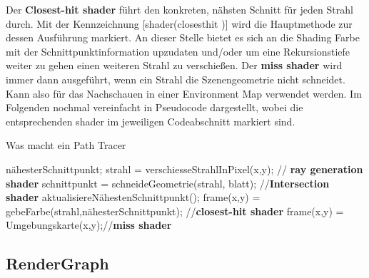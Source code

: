 Der \textbf{Closest-hit shader} führt den konkreten, nähsten Schnitt für jeden Strahl
durch. Mit der Kennzeichnung [shader(\dq closesthit \dq)] wird die Hauptmethode zur 
dessen Ausführung markiert. An dieser Stelle bietet es sich an die Shading Farbe 
mit der Schnittpunktinformation upzudaten und/oder um eine Rekursionstiefe weiter 
zu gehen einen weiteren Strahl zu verschießen. 
Der \textbf{miss shader} wird immer dann ausgeführt, wenn ein Strahl die
Szenengeometrie nicht schneidet. Kann also für das Nachschauen in einer 
Environment Map verwendet werden. Im Folgenden 
nochmal vereinfacht in Pseudocode dargestellt, wobei die entsprechenden shader
im jeweiligen Codeabschnitt markiert sind.

\begin{algorithm}[H]
    \caption{Was macht ein Path Tracer}
    \begin{algorithmic}[1]
        \State nähesterSchnittpunkt;
        \State strahl = verschiesseStrahlInPixel(x,y); // \textbf{ray generation shader}
        \State schnittpunkt = schneideGeometrie(strahl, blatt); //\textbf{Intersection shader}
        \State aktualisiereNähestenSchnittpunkt();
        \EndIf
        \EndFor
        \State frame(x,y) = gebeFarbe(strahl,nähesterSchnittpunkt); //\textbf{closest-hit shader}
        \Else
        \State frame(x,y) = Umgebungskarte(x,y);//\textbf{miss shader}
        \EndIf
        \EndFor
        \EndProcedure
    \end{algorithmic}
    \label{alg:Path Tracer Konzept}
\end{algorithm}

\subsection{RenderGraph}




